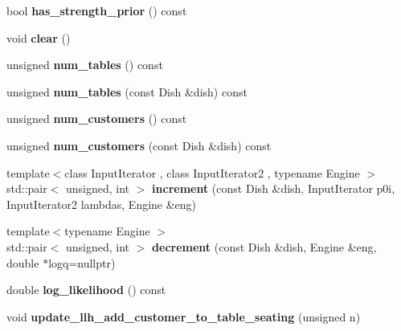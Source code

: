 \begin{DoxyCompactItemize}
bool {\bfseries has\+\_\+strength\+\_\+prior} () const
\item 
\mbox{\label{classcpyp_1_1mf__crp_a65cb2865bba5d4691bebf778f2fedb6a}} 
void {\bfseries clear} ()
\item 
\mbox{\label{classcpyp_1_1mf__crp_aed0b81e9daa2fca1aed8720b1ec0d200}} 
unsigned {\bfseries num\+\_\+tables} () const
\item 
\mbox{\label{classcpyp_1_1mf__crp_a6b60b9bd6e9fcbb4e0f66e644ec4e267}} 
unsigned {\bfseries num\+\_\+tables} (const Dish \&dish) const
\item 
\mbox{\label{classcpyp_1_1mf__crp_a290e1b01d1f88cc0572ef89e2dc57584}} 
unsigned {\bfseries num\+\_\+customers} () const
\item 
\mbox{\label{classcpyp_1_1mf__crp_a83e5e0158fb2a3a9d36ab4822c2bf4db}} 
unsigned {\bfseries num\+\_\+customers} (const Dish \&dish) const
\item 
\mbox{\label{classcpyp_1_1mf__crp_a82485f92ae819d8fac9ac3a79abefe3c}} 
{\footnotesize template$<$class Input\+Iterator , class Input\+Iterator2 , typename Engine $>$ }\\std\+::pair$<$ unsigned, int $>$ {\bfseries increment} (const Dish \&dish, Input\+Iterator p0i, Input\+Iterator2 lambdas, Engine \&eng)
\item 
\mbox{\label{classcpyp_1_1mf__crp_a985694f4664b601f60b2be020d9004f9}} 
{\footnotesize template$<$typename Engine $>$ }\\std\+::pair$<$ unsigned, int $>$ {\bfseries decrement} (const Dish \&dish, Engine \&eng, double $\ast$logq=nullptr)
\item 
\mbox{\label{classcpyp_1_1mf__crp_a4ac30109817b9350ebeeff5c0f580d11}} 
double {\bfseries log\+\_\+likelihood} () const
\item 
\mbox{\label{classcpyp_1_1mf__crp_af11c700ba39305a70b711b5fb5d99628}} 
void {\bfseries update\+\_\+llh\+\_\+add\+\_\+customer\+\_\+to\+\_\+table\+\_\+seating} (unsigned n)

\end{DoxyCompactItemize}
